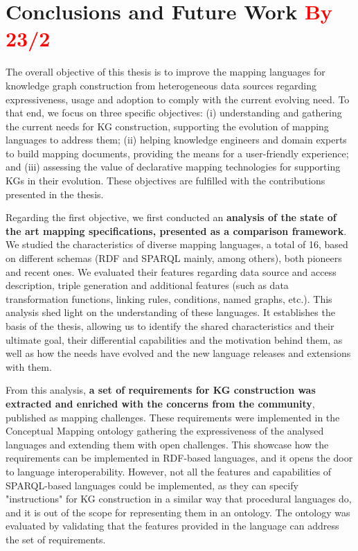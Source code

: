 \chapter{Conclusions and Future Work \textcolor{red}{By 23/2}}
\label{chapter:conclusions}


The overall objective of this thesis is to improve the mapping languages for knowledge graph construction from heterogeneous data sources regarding expressiveness, usage and adoption to comply with the current evolving need. To that end, we focus on three specific objectives: (i) understanding and gathering the current needs for KG construction, supporting the evolution of mapping languages to address them; (ii) helping knowledge engineers and domain experts to build mapping documents, providing the means for a user-friendly experience; and (iii) assessing the value of declarative mapping technologies for supporting KGs in their evolution. These objectives are fulfilled with the contributions presented in the thesis.


Regarding the first objective, we first conducted an \textbf{analysis of the state of the art mapping specifications, presented as a comparison framework}. 
We studied the characteristics of diverse mapping languages, a total of 16, based on different schemas (RDF and SPARQL mainly, among others), both pioneers and recent ones. 
We evaluated their features regarding data source and access description, triple generation and additional features (such as data transformation functions, linking rules, conditions, named graphs, etc.). 
This analysis shed light on the understanding of these languages. It establishes the basis of the thesis, allowing us to identify the shared characteristics and their ultimate goal, their differential capabilities and the motivation behind them, as well as how the needs have evolved and the new language releases and extensions with them.

From this analysis, \textbf{a set of requirements for KG construction was extracted and enriched with the concerns from the community}, published as mapping challenges. 
These requirements were implemented in the Conceptual Mapping ontology gathering the expressiveness of the analysed languages and extending them with open challenges. This showcase how the requirements can be implemented in RDF-based languages, and it opens the door to language interoperability. 
However, not all the features and capabilities of SPARQL-based languages could be implemented, as they can specify "instructions" for KG construction in a similar way that procedural languages do, and it is out of the scope for representing them in an ontology. 
The ontology was evaluated by validating that the features provided in the language can address the set of requirements. 


